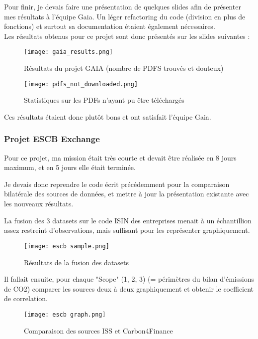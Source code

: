 Pour finir, je devais faire une présentation de quelques slides afin de présenter mes résultats à l'équipe Gaia.
Un léger refactoring du code (division en plus de fonctions) et surtout sa documentation étaient également nécessaires. 
\\
Les résultats obtenus pour ce projet sont donc présentés sur les slides suivantes :

\begin{figure}[H]
    \centering
    \texttt{[image: gaia\_results.png]}
    \caption{Résultats du projet GAIA (nombre de PDFS trouvés et douteux)}
\end{figure}

\begin{figure}[H]
    \centering
    \texttt{[image: pdfs\_not\_downloaded.png]}
    \caption{Statistiques sur les PDFs n'ayant pu être téléchargés}
\end{figure}

Ces résultats étaient donc plutôt bons et ont satisfait l'équipe Gaia.

\pagebreak

\subsubsection{Projet ESCB Exchange}

Pour ce projet, ma mission était très courte et devait être réalisée en 8 jours maximum, et en 5 jours elle était terminée. 

Je devais donc reprendre le code écrit précédemment pour la comparaison bilatérale des sources de données, et mettre à jour la présentation existante avec les nouveaux résultats.

La fusion des 3 datasets sur le code ISIN des entreprises menait à un échantillion assez restreint d'observations, mais suffisant pour les représenter graphiquement.

\begin{figure}[H]
    \centering
    \texttt{[image: escb sample.png]}
    \caption{Résultats de la fusion des datasets}
\end{figure}

Il fallait ensuite, pour chaque "Scope" (1, 2, 3) (= périmètres du bilan d'émissions de CO2) comparer les sources deux à deux graphiquement et obtenir le coefficient de correlation.

\begin{figure}[H]
    \centering
    \texttt{[image: escb graph.png]}
    \caption{Comparaison des sources ISS et Carbon4Finance}
\end{figure}

